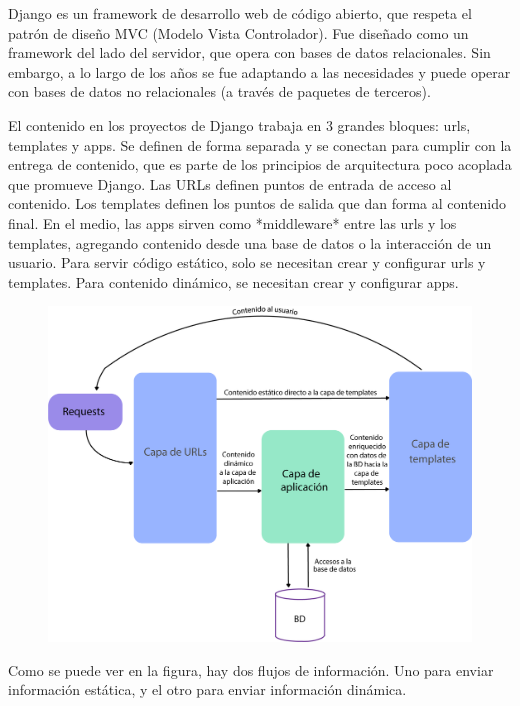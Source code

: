 Django es un framework de desarrollo web de código abierto, que respeta el patrón de diseño MVC (Modelo Vista Controlador). Fue diseñado como un framework del lado del servidor, que opera con bases de datos relacionales. Sin embargo, a lo largo de los años se fue adaptando a las necesidades y puede operar con bases de datos no relacionales (a través de paquetes de terceros).

El contenido en los proyectos de Django trabaja en 3 grandes bloques: urls, templates y apps. Se definen de forma separada y se conectan para cumplir con la entrega de contenido, que es parte de los principios de arquitectura poco acoplada que promueve Django.
Las URLs definen puntos de entrada de acceso al contenido. Los templates definen los puntos de salida que dan forma al contenido final. En el medio, las apps sirven como *middleware* entre las urls y los templates, agregando contenido desde una base de datos o la interacción de un usuario. 
Para servir código estático, solo se necesitan crear y configurar urls y templates. Para contenido dinámico, se necesitan crear y configurar apps.

\begin{figure}[h!]
  \centering
    \includegraphics[scale=0.9]{images/django.png}
  \label{fig:django}
\end{figure}

Como se puede ver en la figura, hay dos flujos de información. Uno para enviar información estática, y el otro para enviar información dinámica.

